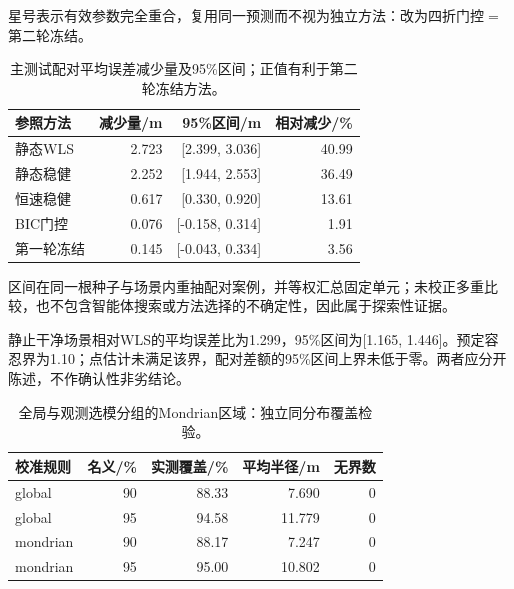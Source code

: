 星号表示有效参数完全重合，复用同一预测而不视为独立方法：改为四折门控$=$第二轮冻结。

\begin{table}[H]\centering\small

\caption{主测试配对平均误差减少量及95\%区间；正值有利于第二轮冻结方法。}

\begin{tabular}{@{}lrrr@{}}\toprule

参照方法 & 减少量/m & 95\%区间/m & 相对减少/\%\\\midrule

静态WLS & 2.723 & [2.399, 3.036] & 40.99\\

静态稳健 & 2.252 & [1.944, 2.553] & 36.49\\

恒速稳健 & 0.617 & [0.330, 0.920] & 13.61\\

BIC门控 & 0.076 & [-0.158, 0.314] & 1.91\\

第一轮冻结 & 0.145 & [-0.043, 0.334] & 3.56\\

\bottomrule\end{tabular}\end{table}

区间在同一根种子与场景内重抽配对案例，并等权汇总固定单元；未校正多重比较，也不包含智能体搜索或方法选择的不确定性，因此属于探索性证据。

静止干净场景相对WLS的平均误差比为1.299，95\%区间为[1.165, 1.446]。预定容忍界为1.10；点估计未满足该界，配对差额的95\%区间上界未低于零。两者应分开陈述，不作确认性非劣结论。

\begin{table}[H]\centering\small

\caption{全局与观测选模分组的Mondrian区域：独立同分布覆盖检验。}

\begin{tabular}{@{}lrrrr@{}}\toprule

校准规则 & 名义/\% & 实测覆盖/\% & 平均半径/m & 无界数\\\midrule

global & 90 & 88.33 & 7.690 & 0\\

global & 95 & 94.58 & 11.779 & 0\\

mondrian & 90 & 88.17 & 7.247 & 0\\

mondrian & 95 & 95.00 & 10.802 & 0\\

\bottomrule\end{tabular}\end{table}

